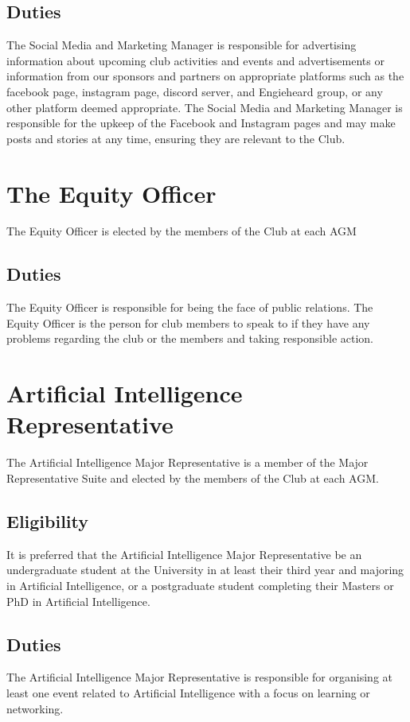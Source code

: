 \documentclass[11pt]{article}
\begin{document}
\subsection{Duties}
The Social Media and Marketing Manager is responsible for advertising information about upcoming club activities and events and advertisements or information from our sponsors and partners on appropriate platforms such as the facebook page, instagram page, discord server, and Engieheard group, or any other platform deemed appropriate.
The Social Media and Marketing Manager is responsible for the upkeep of the Facebook and Instagram pages and may make posts and stories at any time, ensuring they are relevant to the Club.

\section{The Equity Officer}
The Equity Officer is elected by the members of the Club at each AGM
\subsection{Duties}
The Equity Officer is responsible for being the face of public relations. The Equity Officer is the person for club members to speak to if they have any problems regarding the club or the members and taking responsible action.

\section{Artificial Intelligence Representative}
The Artificial Intelligence Major Representative is a member of the Major Representative Suite and elected by the members of the Club at each AGM.
\subsection{Eligibility} 
It is preferred that the Artificial Intelligence Major Representative be an undergraduate student at the University in at least their third year and majoring in Artificial Intelligence, or a postgraduate student completing their Masters or PhD in Artificial Intelligence.
\subsection{Duties}
The Artificial Intelligence Major Representative is responsible for organising at least one event related to Artificial Intelligence with a focus on learning or networking.
\end{document}
